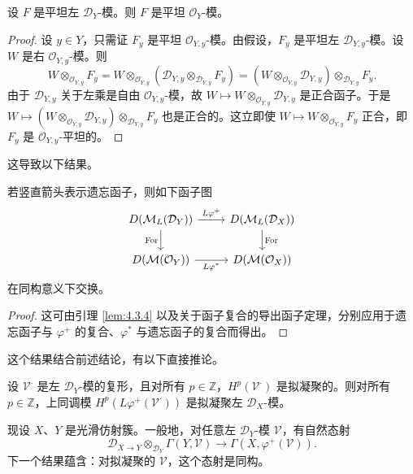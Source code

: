 \begin{lemma}\label{lem:4.3.5}
设 $F$ 是平坦左 $\mathcal{D}_Y$-模。则 $F$ 是平坦 $\mathcal{O}_Y$-模。
\end{lemma}

\begin{proof}
设 $y\in Y$，只需证 $F_y$ 是平坦 $\mathcal{O}_{Y,y}$-模。由假设，$F_y$ 是平坦左 $\mathcal{D}_{Y,y}$-模。设 $W$ 是右
$\mathcal{O}_{Y,y}$-模。则
$$W\otimes_{\mathcal{O}_{Y,y}}F_y=W\otimes_{\mathcal{O}_{Y,y}}(\mathcal{D}_{Y,y}\otimes_{\mathcal{D}_{Y,y}}F_y)
=(W\otimes_{\mathcal{O}_{Y,y}}\mathcal{D}_{Y,y})\otimes_{\mathcal{D}_{Y,y}}F_y.$$
由于 $\mathcal{D}_{Y,y}$ 关于左乘是自由 $\mathcal{O}_{Y,y}$-模，故 $W\mapsto W\otimes_{\mathcal{O}_{Y,y}}\mathcal{D}_{Y,y}$ 是正合函子。于是
$W\mapsto(W\otimes_{\mathcal{O}_{Y,y}}\mathcal{D}_{Y,y})\otimes_{\mathcal{D}_{Y,y}}F_y$ 也是正合的。这立即使
$W\mapsto W\otimes_{\mathcal{O}_{Y,y}}F_y$ 正合，即 $F_y$ 是 $\mathcal{O}_{Y,y}$-平坦的。
\end{proof}

这导致以下结果。

\begin{theorem}\label{thm:4.3.6}
若竖直箭头表示遗忘函子，则如下函子图
$$\begin{tikzcd}
D(\mathcal{M}_L(\mathcal{D}_Y)) \arrow[r,"L\varphi^+"] \arrow[d,"\operatorname{For}"'] &
D(\mathcal{M}_L(\mathcal{D}_X)) \arrow[d,"\operatorname{For}"]\\
D(\mathcal{M}(\mathcal{O}_Y)) \arrow[r,"L\varphi^*"'] & D(\mathcal{M}(\mathcal{O}_X))
\end{tikzcd}$$
在同构意义下交换。
\end{theorem}

\begin{proof}
这可由引理 \ref{lem:4.3.4} 以及关于函子复合的导出函子定理，分别应用于遗忘函子与 $\varphi^+$ 的复合、$\varphi^*$ 与遗忘函子的复合而得出。
\end{proof}

这个结果结合前述结论，有以下直接推论。

\begin{theorem}\label{thm:4.3.7}
设 $\mathcal{V}^\cdot$ 是左 $\mathcal{D}_Y$-模的复形，且对所有 $p\in\mathbb{Z}$，$H^p(\mathcal{V}^\cdot)$ 是拟凝聚的。则对所有 $p\in\mathbb{Z}$，上同调模 $H^p(L\varphi^+(\mathcal{V}^\cdot))$ 是拟凝聚左 $\mathcal{D}_X$-模。
\end{theorem}

现设 $X$、$Y$ 是光滑仿射簇。一般地，对任意左 $\mathcal{D}_Y$-模 $\mathcal{V}$，有自然态射
$$\mathcal{D}_{X\to Y}\otimes_{\mathcal{D}_Y}\Gamma(Y,\mathcal{V})\longrightarrow\Gamma(X,\varphi^+(\mathcal{V})).$$
下一个结果蕴含：对拟凝聚的 $\mathcal{V}$，这个态射是同构。

